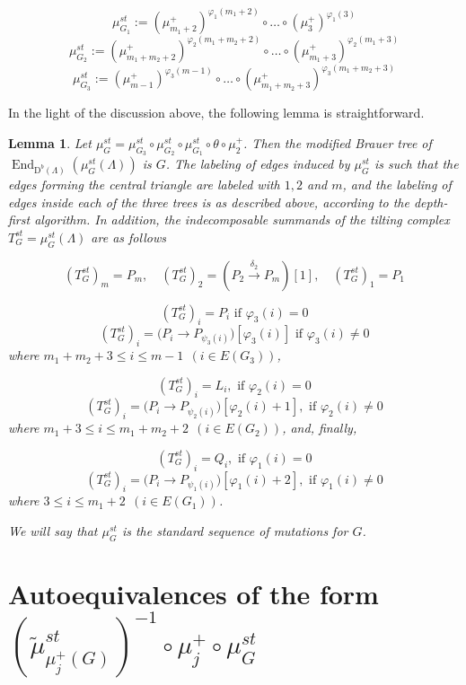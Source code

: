 \documentclass[12pt]{amsart}
\theoremstyle{plain}
\newtheorem{lemma}{Lemma}%
\theoremstyle{remark}
\theoremstyle{definition}
\newcommand{\End}{\mathop{\mathrm{End}}\nolimits}
\newcommand{\D}{{\mathrm{D}}}
\begin{document}
\begin{enumerate}
 $$\mu^{st}_{G_1} := (\mu_{m_1 + 2}^+)^{\varphi_1(m_1+2)} \circ \dots \circ (\mu_3^+)^{\varphi_1(3)} $$
 $$\mu^{st}_{G_2} := (\mu_{m_1 + m_2+2}^+)^{\varphi_2(m_1 + m_2+2)} \circ \dots \circ (\mu_{m_1+3}^+)^{\varphi_2(m_1+3)}$$ 
 $$\mu^{st}_{G_3} := (\mu_{m-1}^+)^{\varphi_3(m-1)} \circ \dots \circ (\mu_{m_1+m_2+3}^+)^{\varphi_3(m_1+m_2+3)}$$ 
 \end{enumerate}
 
 In the light of the discussion above, the following lemma is straightforward. 
 
 \begin{lemma} Let $\mu_G^{st} = \mu^{st}_{G_3} \circ \mu^{st}_{G_2} \circ \mu^{st}_{G_1} \circ \theta \circ \mu_2^+$. Then the modified Brauer tree of $\End_{\D^b(\Lambda)}(\mu_G^{st}(\Lambda))$ is $G$. The labeling of edges induced by $\mu_G^{st}$ is such that the edges forming the central triangle are labeled with $1, 2$ and $m$, and the labeling of edges inside each of the three trees is as described above, according to the depth-first algorithm. In addition, the indecomposable summands of the tilting complex $T^{st}_G = \mu_G^{st}(\Lambda)$ are as follows 
 
 $$(T^{st}_G)_{m} = P_{m}, \quad (T^{st}_G)_{2} =  (P_{2} \xrightarrow{\delta_2} P_{m})[1], \quad (T^{st}_G)_1 = P_1$$ 
  
$$ (T^{st}_G)_i = P_i \text{ if } \varphi_3(i) = 0 $$
$$ (T^{st}_G)_i = \bigg(P_i \to P_{\psi_3(i)}\bigg)[\varphi_3(i)] \text{ if } \varphi_3(i) \neq 0$$
where  $m_1 + m_2+3 \leq i \leq m - 1 \ \ (i \in E(G_3))$, 

$$ (T^{st}_G)_i = L_i, \text{ if } \varphi_2(i) = 0 $$
$$ (T^{st}_G)_i = \bigg(P_i \to P_{\psi_2(i)}\bigg)[\varphi_2(i)+1], \text{ if } \varphi_2(i) \neq 0 $$
where $m_1 + 3 \leq i \leq m_1 + m_2 + 2 \ \ (i \in E(G_2))$, and, finally, 

$$ (T^{st}_G)_i = Q_i, \text{ if } \varphi_1(i) = 0 $$
$$ (T^{st}_G)_i = \bigg(P_i \to P_{\psi_1(i)}\bigg)[\varphi_1(i)+2], \text{ if } \varphi_1(i) \neq 0 $$
where $3 \leq i \leq m_1+2 \ \ (i \in E(G_1))$. 

We will say that $\mu_G^{st}$ is the standard sequence of mutations for $G$. 

 \end{lemma}
  
  
\section{Autoequivalences of the form \texorpdfstring{$(\widetilde{\mu}_{\mu_j^+(G)}^{st})^{-1} \circ \mu_j^+ \circ \mu_G^{st}$}{Lg}}\label{sec:stanyst} 
 
\end{document}
